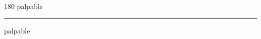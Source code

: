 
\begin{frame}
\begin{center}
\begin{turn}{180}
{\fontsize{2.5cm}{1em}\selectfont palpable}
\end{turn}
\vspace{1em}\par  
\hrule
\vspace{1em}\par  
{\fontsize{2.5cm}{1em}\selectfont palpable}
\end{center}
\end{frame}
